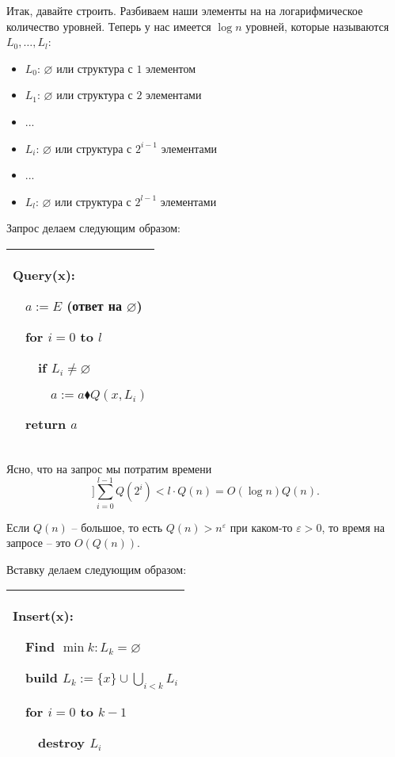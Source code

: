 Итак, давайте строить. Разбиваем наши элементы на на логарифмическое количество уровней. Теперь у нас имеется $\log n $ уровней, которые называются $L_0,\ldots,L_l$: \begin{itemize}
    \item $L_0$: $\varnothing$ или структура с $1$ элементом

    \item $L_1$: $\varnothing$ или структура с $2$ элементами

    \item ...

    \item $L_i$: $\varnothing$ или структура с $2^{i-1}$ элементами

    \item ...

    \item $L_l$: $\varnothing$ или структура с $2^{l-1}$ элементами

\end{itemize}

Запрос делаем следующим образом:

\begin{tabular}{|p{4cm}|}
\hline
Query(x):

$\quad$$a:=E$ (ответ на $\varnothing$)

$\quad$for $i=0$ to $l$

$\quad$$\quad$if $L_i \ne \varnothing$

$\quad$$\quad$$\quad$$a:=a\blacklozenge Q(x,L_i)$

$\quad$return $a$\\
\hline
\end{tabular}


Ясно, что на запрос мы потратим времени \[]\sum_{i=0}^{l-1}Q(2^i)<l\cdot Q(n)=O(\log n)Q(n).\]

\begin{remark}
Если $Q(n)$ -- большое, то есть $Q(n)>n^\varepsilon$ при каком-то $\varepsilon >0$, то время на запросе -- это $O(Q(n))$.
\end{remark} 

Вставку делаем следующим образом:

\begin{tabular}{|p{5cm}|}
\hline
Insert(x):

$\quad$Find $\min k: L_k=\varnothing$

$\quad$build $L_k:=\{x\}\cup \bigcup_{i<k} L_i$

$\quad$for $i=0$ to $k-1$ 

$\quad$$\quad$destroy $L_i$\\

\hline
\end{tabular}

